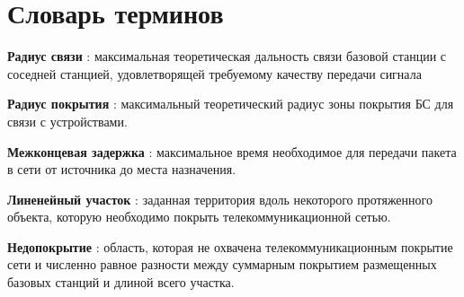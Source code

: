 \chapter*{Словарь терминов}             %


\textbf{Радиус связи} : максимальная теоретическая дальность связи базовой станции с соседней станцией, удовлетворящей требуемому качеству передачи сигнала

\textbf{Радиус покрытия} : максимальный теоретический радиус зоны покрытия БС для связи с устройствами.

\textbf{Межконцевая задержка} : максимальное время необходимое для передачи пакета в сети от источника до места назначения.

\textbf{Линенейный участок} : заданная территория вдоль некоторого протяженного объекта, которую необходимо покрыть телекоммуникационной сетью.

\textbf{Недопокрытие} : область, которая не охвачена телекоммуникационным покрытие сети и численно равное разности между суммарным покрытием размещенных базовых станций и длиной всего участка.


